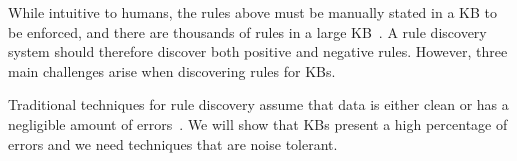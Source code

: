 While intuitive to humans, the rules above must be manually stated in a KB to be enforced, and there are thousands of rules in a large KB~\cite{gc2015big}.
A rule discovery system should therefore discover both positive and negative rules. 
%
%
However, %
three main challenges arise when discovering rules for KBs.

\noindent {}
Traditional techniques for rule discovery assume that data is either clean or has a negligible amount of errors~\cite{abiteboul1995foundations,chu2013discovering}. We will show that KBs present a high percentage of errors and we need techniques that are noise tolerant.

